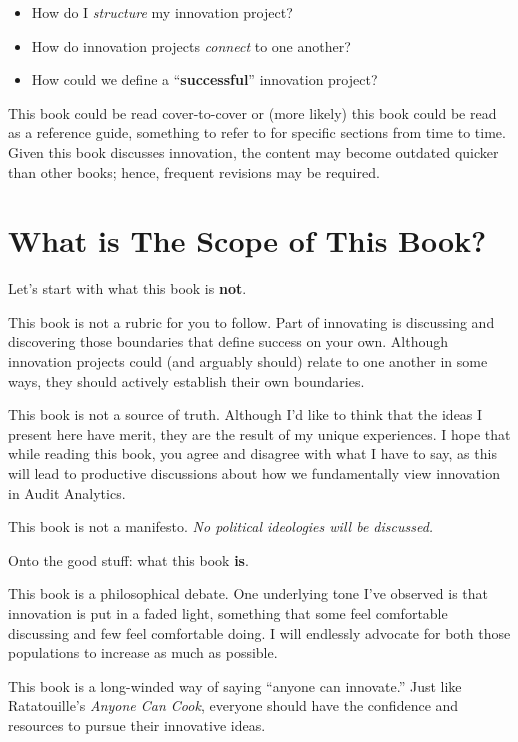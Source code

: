 \documentclass[
]{book}
\theoremstyle{definition}
\theoremstyle{definition}
\theoremstyle{definition}
\theoremstyle{definition}
\theoremstyle{remark}
\begin{document}
\begin{itemize}
\item
  How do I \emph{structure} my innovation project?
\item
  How do innovation projects \emph{connect} to one another?
\item
  How could we define a ``\textbf{successful}'' innovation project?
\end{itemize}

This book could be read cover-to-cover or (more likely) this book could be read
as a reference guide, something to refer to for specific sections from time to
time. Given this book discusses innovation, the content may become outdated
quicker than other books; hence, frequent revisions may be required.

\hypertarget{what-is-the-scope-of-this-book}{%
\section*{What is The Scope of This Book?}\label{what-is-the-scope-of-this-book}}

Let's start with what this book is \textbf{not}.

This book is not a rubric for you to follow. Part of innovating is
discussing and discovering those boundaries that define success on your own.
Although innovation projects could (and arguably should) relate to one another
in some ways, they should actively establish their own boundaries.

This book is not a source of truth. Although I'd like to think that the ideas I
present here have merit, they are the result of my unique experiences. I hope
that while reading this book, you agree and disagree with what I have to say, as
this will lead to productive discussions about how we fundamentally view
innovation in Audit Analytics.

This book is not a manifesto. \emph{No political ideologies will be discussed.}

Onto the good stuff: what this book \textbf{is}.

This book is a philosophical debate. One underlying tone I've observed is that
innovation is put in a faded light, something that some feel comfortable
discussing and few feel comfortable doing. I will endlessly advocate for both
those populations to increase as much as possible.

This book is a long-winded way of saying ``anyone can innovate.'' Just like
Ratatouille's \emph{Anyone Can Cook}, everyone should have the confidence and
resources to pursue their innovative ideas.
\end{document}
